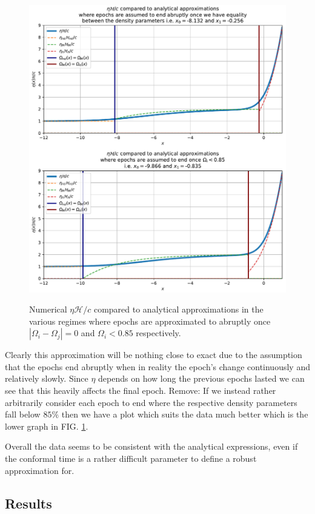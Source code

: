 \documentclass[%
reprint,
 amsmath,amssymb,
 aps,
]{revtex4-2}
\newcommand{\Hp}{\mathcal{H}}
\begin{document}
\begin{figure}[ht!]
	\caption{Numerical $\eta\Hp/c$ compared to analytical approximations in the various regimes where epochs are approximated to abruptly once $|\Omega_i-\Omega_j|=0$ and $\Omega_i<0.85$ respectively.}
	\includegraphics[width = \linewidth]{Figures/Eta_vs_anal_merge.pdf}
	\label{fig:eta_vs_anal_merge}
\end{figure}
Clearly this approximation will be nothing close to exact due to the assumption that the epochs end abruptly when in reality the epoch's change continuously and relatively slowly. Since $\eta$ depends on how long the previous epochs lasted we can see that this heavily affects the final epoch. \color{red} Remove: If we instead rather arbitrarily consider each epoch to end where the respective density parameters fall below $85\%$ then we have a plot which suits the data much better which is the lower graph in FIG. \ref{fig:eta_vs_anal_merge}. \color{black}

Overall the data seems to be consistent with the analytical expressions, even if the conformal time is a rather difficult parameter to define a robust approximation for.

\subsection{Results}
\end{document}
